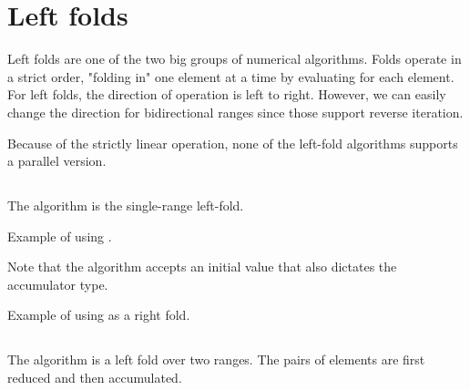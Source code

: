 \section{Left folds}

Left folds are one of the two big groups of numerical algorithms. Folds operate in a strict order, "folding in" one element at a time by evaluating  for each element. For left folds, the direction of operation is left to right. However, we can easily change the direction for bidirectional ranges since those support reverse iteration.

Because of the strictly linear operation, none of the left-fold algorithms supports a parallel version.

\subsection{\texorpdfstring{}{\texttt{std::accumulate}}}

The  algorithm is the single-range left-fold.


\begin{box-note}
\footnotesize Example of using .
\tcblower
{}
\end{box-note}

Note that the algorithm accepts an initial value that also dictates the accumulator type.

\begin{box-note}
\footnotesize Example of using  as a right fold.
\tcblower
{}
\end{box-note}

\subsection{\texorpdfstring{}{\texttt{std::inner\_product}}}

The  algorithm is a left fold over two ranges. The pairs of elements are first reduced and then accumulated.


